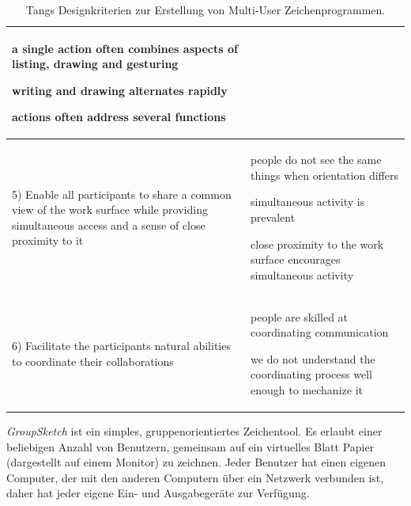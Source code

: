 \begin{table}
\begin{tabularx}{\textwidth}{p{5cm}X}
{	\begin{compactitem}
		\item a single action often combines aspects of listing, drawing and gesturing %
		\item writing and drawing alternates rapidly %
		\item actions often address several functions 
	\end{compactitem} }
	\\ [-12pt] \hline
	\small{
	5) 
	Enable all participants to share a common view of the work surface while providing simultaneous access and a sense of close proximity to it} & \small{ 
	\begin{compactitem}
		\item people do not see the same things when orientation differs %
		\item simultaneous activity is prevalent %
		\item close proximity to the work surface encourages simultaneous activity 
	\end{compactitem} }
	\\ [-12pt] \hline
	\small{
	6) 
	Facilitate the participants natural abilities to coordinate their collaborations} & \small{ 
	\begin{compactitem}
		\item people are skilled at coordinating communication %
		\item we do not understand the coordinating process well enough to mechanize it 
	\end{compactitem} }
	\\ [-12pt] \bottomrule
\end{tabularx}
  \caption[Tangs Designkriterien]{Tangs Designkriterien zur Erstellung von Multi-User Zeichenprogrammen.}
  \label{tab:tangDesignKriterien}
\end{table}
\emph{GroupSketch} ist ein simples, gruppenorientiertes Zeichentool. Es erlaubt einer beliebigen Anzahl von Benutzern, gemeinsam auf ein virtuelles Blatt Papier (dargestellt auf einem Monitor) zu zeichnen. Jeder Benutzer hat einen eigenen Computer, der mit den anderen Computern über ein Netzwerk verbunden ist, daher hat jeder eigene Ein- und Ausgabegeräte zur Verfügung.

